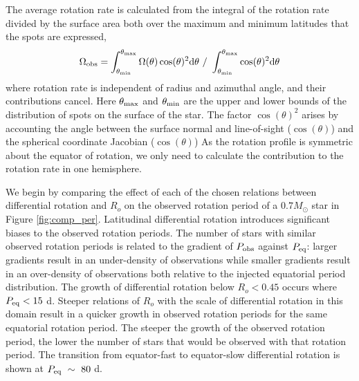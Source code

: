 The average rotation rate is calculated from the integral of the rotation rate divided by the surface area both over the maximum and minimum latitudes that the spots are expressed,
\begin{equation}
\label{eq:inte}
	\Omega_{\rm{obs}} = \int^{\theta_{\rm{max}}}_{\theta_{\rm{min}}} \Omega(\theta) \cos(\theta)^2 \rm{d}\theta \ / \ \int^{\theta_{\rm{max}}}_{\theta_{\rm{min}}} \cos(\theta)^2 \rm{d}\theta
\end{equation}
where rotation rate is independent of radius and azimuthal angle, and their contributions cancel.
Here $\theta_{\rm{max}}$ and $\theta_{\rm{min}}$ are the upper and lower bounds of the distribution of spots on the surface of the star.
The factor $\cos(\theta)^2$ arises by accounting the angle between the surface normal and line-of-sight ($\cos(\theta)$) and the spherical coordinate Jacobian ($\cos(\theta)$)
As the rotation profile is symmetric about the equator of rotation, we only need to calculate the contribution to the rotation rate in one hemisphere.

We begin by comparing the effect of each of the chosen relations between differential rotation and $R_o$ on the observed rotation period of a $0.7 M_{\odot}$ star in Figure \ref{fig:comp_per}.
Latitudinal differential rotation introduces significant biases to the observed rotation periods.
The number of stars with similar observed rotation periods is related to the gradient of $P_{\rm{obs}}$ against $P_{\rm{eq}}$: larger gradients result in an under-density of observations while smaller gradients result in an over-density of observations both relative to the injected equatorial period distribution.
The growth of differential rotation below $R_o < 0.45$ occurs where $P_{\rm{eq}} < 15$ d.
Steeper relations of $R_o$ with the scale of differential rotation in this domain result in a quicker growth in observed rotation periods for the same equatorial rotation period.
The steeper the growth of the observed rotation period, the lower the number of stars that would be observed with that rotation period.
The transition from equator-fast to equator-slow differential rotation is shown at $P_{\rm{eq}} \ \sim \ 80$ d.

